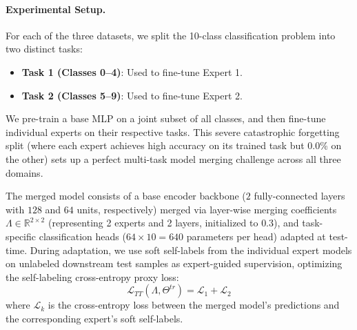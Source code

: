 \paragraph{Experimental Setup.}
For each of the three datasets, we split the 10-class classification problem into two distinct tasks:
\begin{itemize}
    \item \textbf{Task 1 (Classes 0--4)}: Used to fine-tune Expert 1.
    \item \textbf{Task 2 (Classes 5--9)}: Used to fine-tune Expert 2.
\end{itemize}
We pre-train a base MLP on a joint subset of all classes, and then fine-tune individual experts on their respective tasks.
This severe catastrophic forgetting split (where each expert achieves high accuracy on its trained task but 0.0\% on the other) sets up a perfect multi-task model merging challenge across all three domains.

The merged model consists of a base encoder backbone ($2$ fully-connected layers with $128$ and $64$ units, respectively) merged via layer-wise merging coefficients $\Lambda \in \mathbb{R}^{2 \times 2}$ (representing 2 experts and 2 layers, initialized to $0.3$), and task-specific classification heads ($64 \times 10 = 640$ parameters per head) adapted at test-time.
During adaptation, we use soft self-labels from the individual expert models on unlabeled downstream test samples as expert-guided supervision, optimizing the self-labeling cross-entropy proxy loss:
\begin{equation}
    \mathcal{L}_{TT}(\Lambda, \Theta^{tr}) = \mathcal{L}_{1} + \mathcal{L}_{2}
\end{equation}
where $\mathcal{L}_k$ is the cross-entropy loss between the merged model's predictions and the corresponding expert's soft self-labels.

